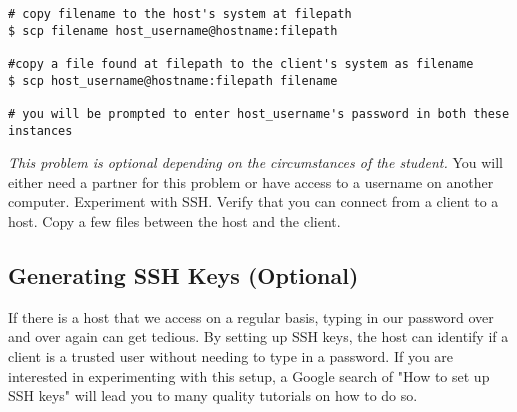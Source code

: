 \begin{lstlisting}
# copy filename to the host's system at filepath
$ scp filename host_username@hostname:filepath

#copy a file found at filepath to the client's system as filename
$ scp host_username@hostname:filepath filename

# you will be prompted to enter host_username's password in both these instances 
\end{lstlisting}

\begin{problem}
\emph{This problem is optional depending on the circumstances of the student.}
You will either need a partner for this problem or have access to a username on another computer. Experiment with SSH. Verify that you can connect from a client to a host. Copy a few files between the host and the client.
\end{problem}

\subsection*{Generating SSH Keys (Optional)}
If there is a host that we access on a regular basis, typing in our password over and over again can get tedious. By setting up SSH keys, the host can identify if a client is a trusted user without needing to type in a password. If you are interested in experimenting with this setup, a Google search of "How to set up SSH keys" will lead you to many quality tutorials on how to do so.
